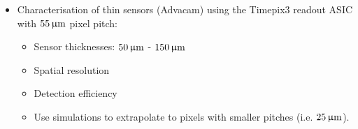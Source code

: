 \begin{frame}
  \begin{itemize}
  \item Characterisation of thin sensors (Advacam) using the
    Timepix3 readout ASIC with \textcolor{Blue}{$55\,\upmu\mathrm{m}$} pixel
    pitch:
    \begin{itemize}
    \item Sensor thicknesses: $50\,\upmu\mathrm{m}$ - $150\,\upmu\mathrm{m}$
    \item Spatial resolution
    \item Detection efficiency
    \item Use simulations to extrapolate to pixels with smaller
      pitches (i.e. $25\,\upmu\mathrm{m}$).
    \end{itemize}
  \end{itemize}


\end{frame}

